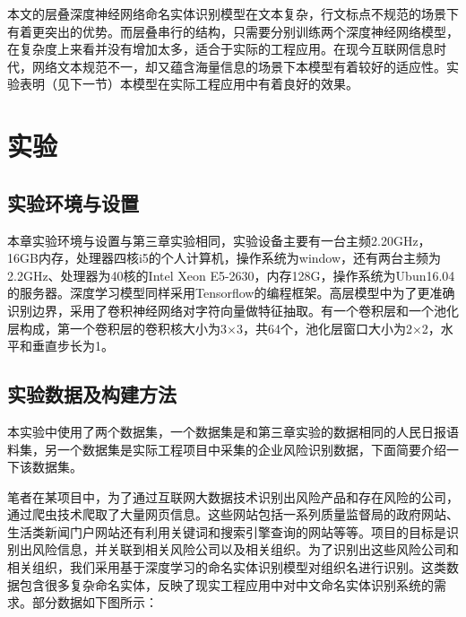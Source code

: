 \documentclass[winfonts,master,oneside,nobackinfo]{njuthesis}
\begin{document}
本文的层叠深度神经网络命名实体识别模型在文本复杂，行文标点不规范的场景下有着更突出的优势。而层叠串行的结构，只需要分别训练两个深度神经网络模型，在复杂度上来看并没有增加太多，适合于实际的工程应用。在现今互联网信息时代，网络文本规范不一，却又蕴含海量信息的场景下本模型有着较好的适应性。实验表明（见下一节）本模型在实际工程应用中有着良好的效果。

\section{实验}

\subsection{实验环境与设置}

本章实验环境与设置与第三章实验相同，实验设备主要有一台主频2.20GHz，16GB内存，处理器四核i5的个人计算机，操作系统为window，还有两台主频为2.2GHz、处理器为40核的Intel Xeon E5-2630，内存128G，操作系统为Ubun16.04的服务器。深度学习模型同样采用Tensorflow的编程框架。高层模型中为了更准确识别边界，采用了卷积神经网络对字符向量做特征抽取。有一个卷积层和一个池化层构成，第一个卷积层的卷积核大小为3×3，共64个，池化层窗口大小为2×2，水平和垂直步长为1。

\subsection{实验数据及构建方法}

本实验中使用了两个数据集，一个数据集是和第三章实验的数据相同的人民日报语料集，另一个数据集是实际工程项目中采集的企业风险识别数据，下面简要介绍一下该数据集。

笔者在某项目中，为了通过互联网大数据技术识别出风险产品和存在风险的公司，通过爬虫技术爬取了大量网页信息。这些网站包括一系列质量监督局的政府网站、生活类新闻门户网站还有利用关键词和搜索引擎查询的网站等等。项目的目标是识别出风险信息，并关联到相关风险公司以及相关组织。为了识别出这些风险公司和相关组织，我们采用基于深度学习的命名实体识别模型对组织名进行识别。这类数据包含很多复杂命名实体，反映了现实工程应用中对中文命名实体识别系统的需求。部分数据如下图所示：
\end{document}
